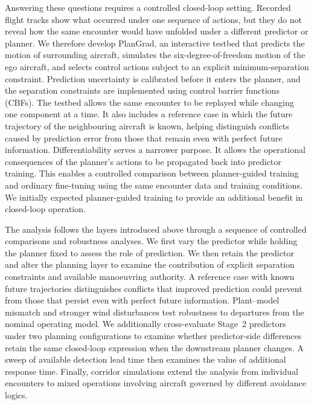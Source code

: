 \documentclass[11pt]{article}
\theoremstyle{plain}
\theoremstyle{definition}
\newcommand{\method}{PlanGrad}
\begin{document}
Answering these questions requires a controlled closed-loop setting. Recorded flight tracks show what occurred under one sequence of actions, but they do not reveal how the same encounter would have unfolded under a different predictor or planner. We therefore develop \method, an interactive testbed that predicts the motion of surrounding aircraft, simulates the six-degree-of-freedom motion of the ego aircraft, and selects control actions subject to an explicit minimum-separation constraint. Prediction uncertainty is calibrated before it enters the planner, and the separation constraints are implemented using control barrier functions (CBFs). The testbed allows the same encounter to be replayed while changing one component at a time. It also includes a reference case in which the future trajectory of the neighbouring aircraft is known, helping distinguish conflicts caused by prediction error from those that remain even with perfect future information. Differentiability serves a narrower purpose. It allows the operational consequences of the planner's actions to be propagated back into predictor training. This enables a controlled comparison between planner-guided training and ordinary fine-tuning using the same encounter data and training conditions. We initially expected planner-guided training to provide an additional benefit in closed-loop operation.

The analysis follows the layers introduced above through a sequence of
controlled comparisons and robustness analyses. We first vary the
predictor while holding the planner fixed to assess the role of
prediction. We then retain the predictor and alter the planning layer
to examine the contribution of explicit separation constraints and
available manoeuvring authority. A reference case with known future
trajectories distinguishes conflicts that improved prediction could
prevent from those that persist even with perfect future information.
Plant--model mismatch and stronger wind disturbances test robustness
to departures from the nominal operating model. We additionally
cross-evaluate Stage~2 predictors under two planning configurations to
examine whether predictor-side differences retain the same closed-loop
expression when the downstream planner changes. A sweep of available
detection lead time then examines the value of additional response
time. Finally, corridor simulations extend the analysis from individual
encounters to mixed operations involving aircraft governed by different
avoidance logics.
\end{document}
